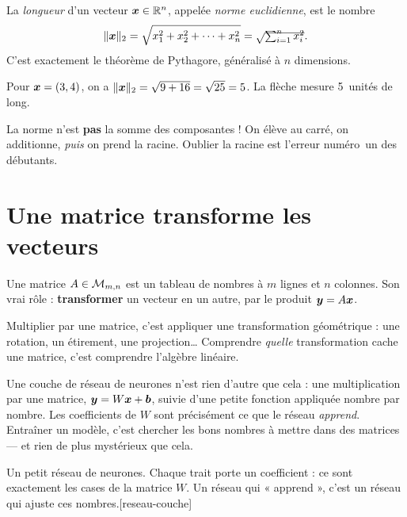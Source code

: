 \begin{definition}
La \emph{longueur} d'un vecteur $\bm{x}\in\mathbb{R}^{n}$, appelée \emph{norme
euclidienne}, est le nombre
\[
  \lVert\bm{x}\rVert_2 = \sqrt{x_1^2 + x_2^2 + \dots + x_n^2}
                    = \sqrt{\smash{\textstyle\sum_{i=1}^{n} x_i^2}}.
\]
C'est exactement le théorème de Pythagore, généralisé à $n$ dimensions.
\end{definition}

\begin{exemple}
Pour $\bm{x} = (3, 4)$, on a $\lVert\bm{x}\rVert_2 = \sqrt{9 + 16}
= \sqrt{25} = 5$. La flèche mesure 5~unités de long.
\end{exemple}

\begin{piege}
La norme n'est \textbf{pas} la somme des composantes ! On élève au carré,
on additionne, \emph{puis} on prend la racine. Oublier la racine est
l'erreur numéro~un des débutants.
\end{piege}

\section{Une matrice transforme les vecteurs}

Une matrice $A \in \mathcal{M}_{m,n}$ est un tableau de nombres à $m$ lignes et
$n$ colonnes. Son vrai rôle : \textbf{transformer} un vecteur en un autre,
par le produit $\bm{y} = A\bm{x}$.

\begin{aretenir}
Multiplier par une matrice, c'est appliquer une transformation
géométrique : une rotation, un étirement, une projection\dots{} Comprendre
\emph{quelle} transformation cache une matrice, c'est comprendre l'algèbre
linéaire.
\end{aretenir}

\begin{enia}
Une couche de réseau de neurones n'est rien d'autre que cela : une
multiplication par une matrice, $\bm{y} = W\bm{x} + \bm{b}$, suivie
d'une petite fonction appliquée nombre par nombre. Les coefficients de $W$
sont précisément ce que le réseau \emph{apprend}. Entraîner un modèle,
c'est chercher les bons nombres à mettre dans des matrices — et rien de
plus mystérieux que cela.
\end{enia}

\begin{schema}{Un petit réseau de neurones. Chaque trait porte un
coefficient : ce sont exactement les cases de la matrice $W$. Un réseau
qui « apprend », c'est un réseau qui ajuste ces nombres.}[reseau-couche]
\end{schema}

